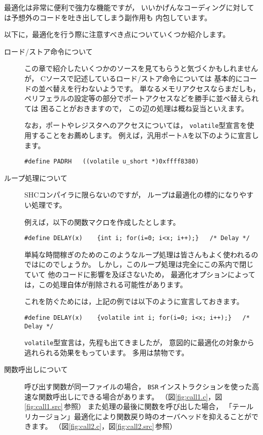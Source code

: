\documentclass[a4j,10pt,fleqn]{jsarticle}
\begin{document}
最適化は非常に便利で強力な機能ですが，
いいかげんなコーディングに対しては予想外のコードを吐き出してしまう副作用も
内包しています。

以下に，最適化を行う際に注意すべき点についていくつか紹介します。

\begin{description}

\item[ロード/ストア命令について]
この章で紹介したいくつかのソースを見てもらうと気づくかもしれませんが，
Cソースで記述しているロード/ストア命令については
基本的にコードの並べ替えを行わないようです。
単なるメモリアクセスならまだしも，
ペリフェラルの設定等の部分でポートアクセスなどを勝手に並べ替えられては
困ることがおきますので，
この辺の処理は概ね妥当といえます。
\par なお，ポートやレジスタへのアクセスについては，
\texttt{volatile}型宣言を使用することをお薦めします。
例えば，汎用ポートAを以下のように宣言します。
\begin{screen}\begin{verbatim}
#define PADRH   ((volatile u_short *)0xffff8380)
\end{verbatim}\end{screen}

\item[ループ処理について]
SHCコンパイラに限らないのですが，
ループは最適化の標的になりやすい処理です。
\par 例えば，以下の関数マクロを作成したとします。
\begin{screen}\begin{verbatim}
#define DELAY(x)    {int i; for(i=0; i<x; i++);}   /* Delay */
\end{verbatim}\end{screen}
単純な時間稼ぎのためのこのようなループ処理は皆さんもよく使われるのではにのでしょうか。
しかし，このループ処理は完全にこの系内で閉じていて
他のコードに影響を及ぼさないため，
最適化オプションによっては，この処理自体が削除される可能性があります。
\par これを防ぐためには，上記の例では以下のように宣言しておきます。
\begin{screen}\begin{verbatim}
#define DELAY(x)    {volatile int i; for(i=0; i<x; i++);}   /* Delay */
\end{verbatim}\end{screen}
\texttt{volatile}型宣言は，先程も出てきましたが，
意図的に最適化の対象から逃れられる効果をもっています。
多用は禁物です。

\item[関数呼出しについて]
呼び出す関数が同一ファイルの場合，
\texttt{BSR}\,インストラクションを使った高速な関数呼出しにできる場合があります。
（図\ref{fig:call1.c}，図\ref{fig:call1.src}\,参照）
また処理の最後に関数を呼び出した場合，
「テールリカージョン」最適化により関数戻り時のオーバヘッドを抑えることができます。
（図\ref{fig:call2.c}，図\ref{fig:call2.src}\,参照）

\end{description}
\end{document}
